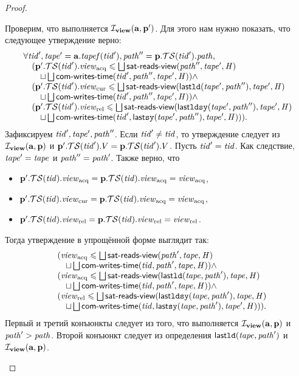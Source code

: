 \begin{proof}
\begin{itemize}
    Проверим, что выполняется $\invView (\aT, \p')$. Для этого нам нужно показать, что следующее утверждение верно:
      \[\begin{array}{l}
        \forall \tId', \tape' = \aT.\tapef(\tId'), \cpath'' = \p.\TSfprom(\tId').\cpath, \\
        \quad (\p'.\TSfprom(\tId').\Racq \le \bigsqcup \readsSatisfiedR(\cpath'', \tape', \hmap) \\
        \quad \quad \sqcup \bigsqcup \opstau(\tId', \cpath'', \tape', \hmap)) \land \\
        \quad (\p'.\TSfprom(\tId').\Rcur \le \bigsqcup \readsSatisfiedR(\lastLD(\tape', \cpath''), \tape', \hmap) \\
        \quad \quad \sqcup \bigsqcup \opstau(\tId', \cpath'', \tape', \hmap)) \land \\
        \quad (\p'.\TSfprom(\tId').\Rrel \le \bigsqcup \readsSatisfiedR(\lastLDSY(\tape', \cpath''), \tape', \hmap) \\
        \quad \quad \sqcup \bigsqcup \opstau(\tId', \lastSY(\tape', \cpath''), \tape', \hmap))).
      \end{array}\]
    Зафиксируем $\tId', \tape', \cpath''$. Если $\tId' \not = \tId$, то утверждение следует из $\invView(\aT, \p)$ и 
    $\p'.\TSfprom(\tId').\V = \p.\TSfprom(\tId').\V$.
    Пусть $\tId' = \tId$. Как следствие, $\tape' = \tape$ и $\cpath'' = \cpath'$.
    Также верно, что
    \begin{itemize}
      \item $\p'.\TSfprom(\tId).\Racq = \p.\TSfprom(\tId).\Racq = \Racq$,
      \item $\p'.\TSfprom(\tId).\Rcur = \p.\TSfprom(\tId).\Racq = \Racq$,
      \item $\p'.\TSfprom(\tId).\Rrel = \p.\TSfprom(\tId).\Rrel = \Rrel$.
    \end{itemize}
    Тогда утверждение в упрощённой форме выглядит так:
     \[\begin{array}{l}
       \quad (\Racq \le \bigsqcup \readsSatisfiedR(\cpath', \tape, \hmap) \\
       \quad \quad \sqcup \bigsqcup \opstau(\tId, \cpath', \tape, \hmap)) \land \\
       \quad (\Racq \le \bigsqcup \readsSatisfiedR(\lastLD(\tape, \cpath'), \tape, \hmap) \\
       \quad \quad \sqcup \bigsqcup \opstau(\tId, \cpath', \tape, \hmap)) \land \\
       \quad (\Rrel \le \bigsqcup \readsSatisfiedR(\lastLDSY(\tape, \cpath'), \tape, \hmap) \\
       \quad \quad \sqcup \bigsqcup \opstau(\tId, \lastSY(\tape, \cpath'), \tape', \hmap))).
     \end{array}\]
     Первый и третий конъюнкты следует из того, что выполняется $\invView(\aT, \p)$ и $\cpath' > \cpath$.
     Второй конъюнкт следует из определения $\lastLD(\tape, \cpath')$ и $\invView(\aT, \p)$.


\end{itemize}
\end{proof}
